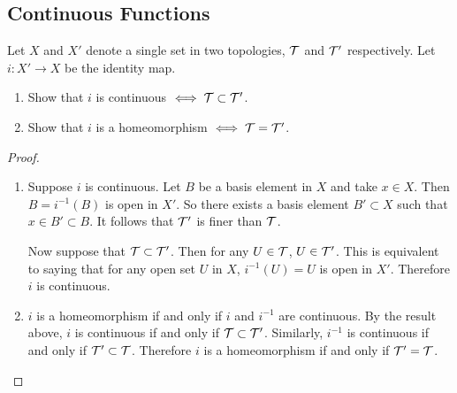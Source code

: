 \subsection{Continuous Functions}
\begin{ex}{18.3}
    Let $X$ and $X'$ denote a single set in two topologies, $\mathcal{T}$ and $\mathcal{T}'$ respectively.
    Let $i:X'\to X$ be the identity map.
    \begin{enumerate}
        \item Show that $i$ is continuous $\iff\mathcal{T}\subset\mathcal{T}'$.
        \item Show that $i$ is a homeomorphism $\iff\mathcal{T}=\mathcal{T}'$.
    \end{enumerate}    
\end{ex}
\begin{proof}
    ${}$
    \begin{enumerate}
        \item Suppose $i$ is continuous. Let $B$ be a basis element in $X$ and take $x\in X$. 
            Then $B=i^{-1}(B)$ is open in $X'$. So there exists a basis element $B'\subset X$ such that $x\in B'\subset B$.
            It follows that $\mathcal{T}'$ is finer than $\mathcal{T}$.

            Now suppose that $\mathcal{T}\subset\mathcal{T}'$. Then for any $U\in\mathcal{T}$, $U\in\mathcal{T}'$. 
            This is equivalent to saying that for any open set $U$ in $X$, $i^{-1}(U)=U$ is open in $X'$.
            Therefore $i$ is continuous.
        \item $i$ is a homeomorphism if and only if $i$ and $i^{-1}$ are continuous.
            By the result above, $i$ is continuous if and only if $\mathcal{T}\subset\mathcal{T}'$. 
            Similarly, $i^{-1}$ is continuous if and only if $\mathcal{T}'\subset\mathcal{T}$. 
            Therefore $i$ is a homeomorphism if and only if $\mathcal{T}'=\mathcal{T}$.
    \end{enumerate}
\end{proof}
